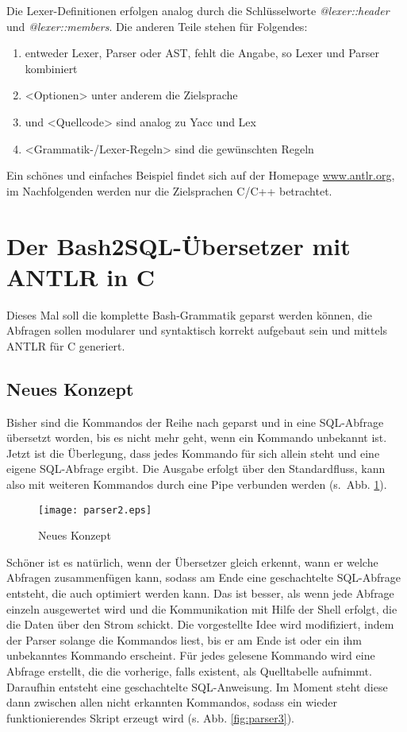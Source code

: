 Die Lexer-Definitionen erfolgen analog durch die Schlüsselworte \textit{@lexer::header} und \textit{@lexer::members}. Die anderen Teile stehen für Folgendes:
\begin{enumerate}
\item <Grammatik-Typ> entweder Lexer, Parser oder AST, fehlt die Angabe, so Lexer und Parser kombiniert
\item <Optionen> unter anderem die Zielsprache
\item <Token-Definition> und <Quellcode> sind analog zu Yacc und Lex
\item <Grammatik-/Lexer-Regeln> sind die gewünschten Regeln
\end{enumerate}
Ein schönes und einfaches Beispiel findet sich auf der Homepage \url{www.antlr.org}, im Nachfolgenden werden nur die Zielsprachen C/C++ betrachtet.
\newpage
\section{Der Bash2SQL-Übersetzer mit ANTLR in C}
Dieses Mal soll die komplette Bash-Grammatik geparst werden können, die Abfragen sollen modularer und syntaktisch korrekt aufgebaut sein und mittels ANTLR für C generiert.

\subsection{Neues Konzept}
Bisher sind die Kommandos der Reihe nach geparst und in eine SQL-Abfrage übersetzt worden, bis es nicht mehr geht, wenn ein Kommando unbekannt ist. Jetzt ist die Überlegung, dass jedes Kommando für sich allein steht und eine eigene SQL-Abfrage ergibt. Die Ausgabe erfolgt über den Standardfluss, kann also mit weiteren Kommandos durch eine Pipe verbunden werden (s.\ Abb. \ref{fig:parser2}).

\begin{figure}[h]
\centering
\texttt{[image: parser2.eps]}
\caption{Neues Konzept}
\label{fig:parser2}
\end{figure}

Schöner ist es natürlich, wenn der Übersetzer gleich erkennt, wann er welche Abfragen zusammenfügen kann, sodass am Ende eine geschachtelte SQL-Abfrage entsteht, die auch optimiert werden kann. Das ist besser, als wenn jede Abfrage einzeln ausgewertet wird und die Kommunikation mit Hilfe der Shell erfolgt, die die Daten über den Strom schickt. Die vorgestellte Idee wird modifiziert, indem der Parser solange die Kommandos liest, bis er am Ende ist oder ein ihm unbekanntes Kommando erscheint. Für jedes gelesene Kommando wird eine Abfrage erstellt, die die vorherige, falls existent, als Quelltabelle aufnimmt. Daraufhin entsteht eine geschachtelte SQL-Anweisung. Im Moment steht diese dann zwischen allen nicht erkannten Kommandos, sodass ein wieder funktionierendes Skript erzeugt wird (s. Abb. \ref{fig:parser3}).

